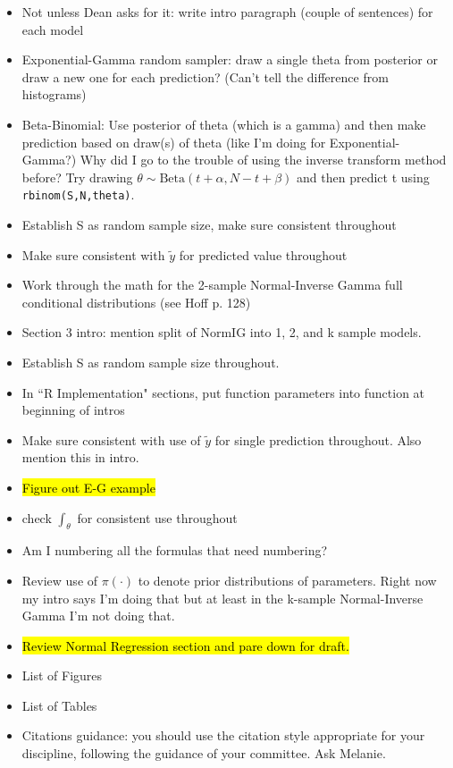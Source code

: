 \documentclass[12pt, a4paper]{article}
\begin{document}
\begin{itemize}
  \item Not unless Dean asks for it:  write intro paragraph (couple of sentences) for each model
  \item Exponential-Gamma random sampler:  draw a single theta from posterior or draw a new one for each prediction?  (Can't tell the difference from histograms)
  \item Beta-Binomial:  Use posterior of theta (which is a gamma) and then make prediction based on draw(s) of theta (like I'm doing for Exponential-Gamma?)  Why did I go to the trouble of using the inverse transform method before?  Try drawing $\theta\sim\text{Beta}(t+\alpha,N-t+\beta)$ and then predict t using \texttt{rbinom(S,N,theta)}.
  \item Establish S as random sample size, make sure consistent throughout
  \item Make sure consistent with $\tilde{y}$ for predicted value throughout
  \item Work through the math for the 2-sample Normal-Inverse Gamma full conditional distributions (see Hoff p. 128)
  \item Section 3 intro:  mention split of NormIG into 1, 2, and k sample models.
  \item Establish S as random sample size throughout.
  \item In ``R Implementation" sections, put function parameters into function at beginning of intros
  \item Make sure consistent with use of $\tilde{y}$ for single prediction throughout.  Also mention this in intro.
  \item \hl{Figure out E-G example}
  \item check $\int_\theta$ for consistent use throughout
  \item Am I numbering all the formulas that need numbering?
  \item Review use of $\pi(\cdot)$ to denote prior distributions of parameters.  Right now my intro says I'm doing that but at least in the k-sample Normal-Inverse Gamma I'm not doing that.
  \item \hl{Review Normal Regression section and pare down for draft.}
  \item List of Figures
  \item List of Tables
  \item Citations guidance:  you should use the citation style appropriate for your discipline, following
the guidance of your committee.  Ask Melanie.

\end{itemize}
\end{document}

